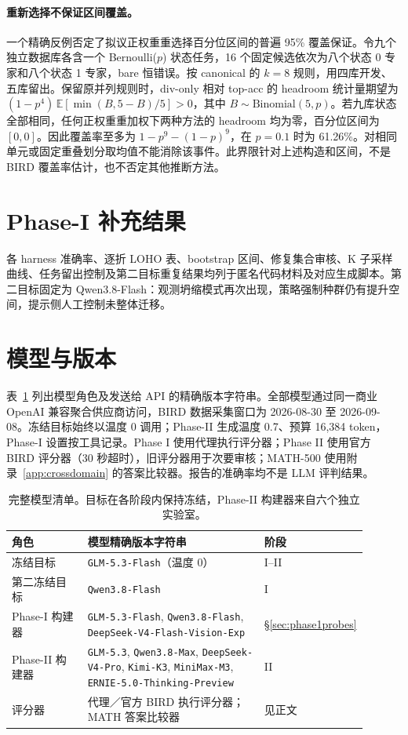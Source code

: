 \paragraph{重新选择不保证区间覆盖。}
一个精确反例否定了拟议正权重重选择百分位区间的普遍 95\% 覆盖保证。令九个独立数据库各含一个 Bernoulli($p$) 状态任务，16 个固定候选依次为八个状态 0 专家和八个状态 1 专家，bare 恒错误。按 canonical 的 $k=8$ 规则，用四库开发、五库留出。保留原并列规则时，div-only 相对 top-acc 的 headroom 统计量期望为 $(1-p^4)\,\mathbb{E}[\min(B,5-B)/5]>0$，其中 $B\sim\mathrm{Binomial}(5,p)$。若九库状态全部相同，任何正权重重加权下两种方法的 headroom 均为零，百分位区间为 $[0,0]$。因此覆盖率至多为 $1-p^9-(1-p)^9$，在 $p=0.1$ 时为 61.26\%。对相同单元或固定重叠划分取均值不能消除该事件。此界限针对上述构造和区间，不是 BIRD 覆盖率估计，也不否定其他推断方法。

\section{Phase-I 补充结果}\label{app:phase1-results}
各 harness 准确率、逐折 LOHO 表、bootstrap 区间、修复集合审核、K 子采样曲线、任务留出控制及第二目标重复结果均列于匿名代码材料及对应生成脚本。第二目标固定为 Qwen3.8-Flash：观测坍缩模式再次出现，策略强制种群仍有提升空间，提示侧人工控制未整体迁移。

\section{模型与版本}\label{app:models}
表~\ref{tab:models} 列出模型角色及发送给 API 的精确版本字符串。全部模型通过同一商业 OpenAI 兼容聚合供应商访问，BIRD 数据采集窗口为 2026-08-30 至 2026-09-08。冻结目标始终以温度 0 调用；Phase-II 生成温度 0.7、预算 16,384 token，Phase-I 设置按工具记录。Phase I 使用代理执行评分器；Phase II 使用官方 BIRD 评分器（30 秒超时），旧评分器用于次要审核；MATH-500 使用附录~\ref{app:crossdomain} 的答案比较器。报告的准确率均不是 LLM 评判结果。
\begin{table}[h]\centering\small
\begin{tabular}{p{0.22\linewidth}p{0.52\linewidth}p{0.16\linewidth}}\toprule
角色 & 模型精确版本字符串 & 阶段 \\\midrule
冻结目标 & \texttt{GLM-5.3-Flash}（温度 0） & I--II \\
第二冻结目标 & \texttt{Qwen3.8-Flash} & I \\
Phase-I 构建器 & \texttt{GLM-5.3-Flash}, \texttt{Qwen3.8-Flash}, \texttt{DeepSeek-V4-Flash-Vision-Exp} & \S\ref{sec:phase1probes} \\
Phase-II 构建器 & \texttt{GLM-5.3}, \texttt{Qwen3.8-Max}, \texttt{DeepSeek-V4-Pro}, \texttt{Kimi-K3}, \texttt{MiniMax-M3}, \texttt{ERNIE-5.0-Thinking-Preview} & II \\
评分器 & 代理／官方 BIRD 执行评分器；MATH 答案比较器 & 见正文 \\\bottomrule
\end{tabular}
\caption{完整模型清单。目标在各阶段内保持冻结，Phase-II 构建器来自六个独立实验室。}\label{tab:models}
\end{table}

